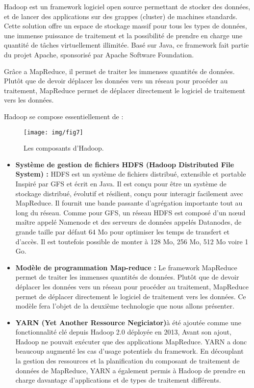 \begin{enumerate}[label=\protect\ding{\value*}, start=182,font=\color{blue}]
Hadoop est un framework logiciel open source permettant de stocker des données, et de lancer des applications sur des grappes (cluster) de machines standards. Cette solution offre un espace de stockage massif pour tous les types de données, une immense puissance de traitement et la possibilité de prendre en charge une quantité de tâches virtuellement illimitée. Basé sur Java, ce framework fait partie du projet Apache, sponsorisé par Apache Software Foundation.

Grâce a MapReduce, il permet de traiter les immenses quantités de données. Plutôt que de devoir déplacer les données vers un réseau pour procéder au traitement, MapReduce permet de déplacer directement le logiciel de traitement vers les données. 

Hadoop se compose essentiellement de :

\begin{figure}[h]
	\centering
	\texttt{[image: img/fig7]}
	\caption{Les composants d'Hadoop.}
\end{figure}

\begin{itemize}[label=]
\item \textbf{Système de gestion de fichiers HDFS (Hadoop Distributed File System) :} HDFS est un système de fichiers distribué, extensible et portable Inspiré par GFS et écrit en Java. Il est conçu pour être un système de stockage distribué, évolutif et résilient, conçu pour interagir facilement avec MapReduce. Il fournit une bande passante d'agrégation importante tout au long du réseau. Comme pour GFS, un réseau HDFS est composé d'un nœud maître appelé Namenode et des serveurs de données appelés Datanodes, de grande taille par défaut 64 Mo pour optimiser les temps de transfert et d'accès. Il est toutefois possible de monter à 128 Mo, 256 Mo, 512 Mo voire 1 Go.
\item \textbf{Modèle de programmation Map-reduce :} Le framework MapReduce permet de traiter les immenses quantités de données. Plutôt que de devoir déplacer les données vers un réseau pour procéder au traitement, MapReduce permet de déplacer directement le logiciel de traitement vers les données. Ce modèle fera l'objet de la deuxième technologie que nous allons présenter.
\item \textbf{YARN (Yet Another Ressource Negiciator)}à été ajoutée comme une fonctionnalité clé depuis Hadoop 2.0 déployée en 2013, Avant son ajout, Hadoop ne pouvait exécuter que des applications MapReduce. YARN a donc beaucoup augmenté les cas d’usage potentiels du framework. En découplant la gestion des ressources et la planification du composant de traitement de données de MapReduce, YARN a également permis à Hadoop de prendre en charge davantage d’applications et de types de traitement différents.


\end{itemize}
\end{enumerate}
